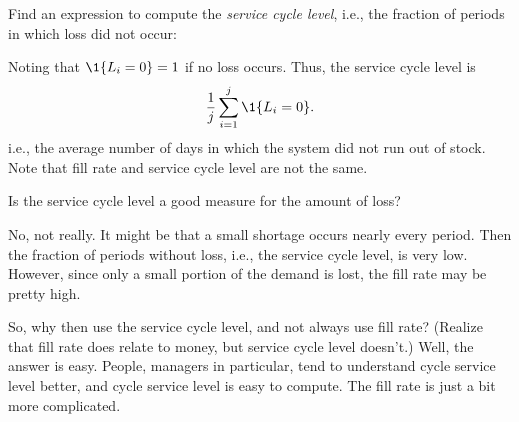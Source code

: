 \begin{exercise}
Find an expression to compute  the \emph{service cycle level}, i.e., the fraction of periods in which loss did not occur:
\begin{solution}
Noting that $\1{L_i=0}=1$ if no loss occurs. Thus, the service cycle level is
\begin{equation*}
  \frac 1 j \sum_{i=1}^j \1{L_i=0}.
\end{equation*}
i.e., the average number of days in which the system did not run out of stock.
Note that fill rate and service cycle level are not the same. 
\end{solution}
\end{exercise}



\begin{exercise}
  Is the service cycle level a good measure for the  amount of loss?


  \begin{solution}
    No, not really. It might be that a small shortage occurs nearly
    every period. Then the fraction of periods without loss, i.e., the
    service cycle level, is very low. However, since only a small
    portion of the demand is lost, the fill rate may be pretty high. 

    So, why then use the service cycle level, and not always use
    fill rate? (Realize that fill rate does relate to money, but
    service cycle level doesn't.) Well, the answer is easy. People,
    managers in particular, tend to understand cycle service level
    better, and cycle service level is easy to compute. The fill rate
    is just a bit more complicated. 
  \end{solution}
\end{exercise}




\clearpage


